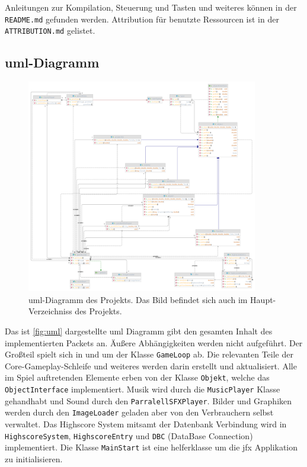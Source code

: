 Anleitungen zur Kompilation, Steuerung und Tasten und weiteres können in der \texttt{README.md} gefunden werden.
Attribution für benutzte Ressourcen ist in der \texttt{ATTRIBUTION.md} gelistet.

\subsection{\acrshort{uml}-Diagramm}

\begin{figure}[H]
    \centering
    \includegraphics[width=0.9\textwidth]{img/uml.png}
    \caption{\gls{uml}-Diagramm des Projekts. Das Bild befindet sich auch im Haupt-Verzeichniss des Projekts.}
    \label{fig:uml}
\end{figure}

Das ist \autoref{fig:uml} dargestellte \gls{uml} Diagramm gibt den gesamten Inhalt des implementierten Packets an.
Äußere Abhängigkeiten werden nicht aufgeführt.
Der Großteil spielt sich in und um der Klasse \texttt{GameLoop} ab.
Die relevanten Teile der Core-Gameplay-Schleife und weiteres werden darin erstellt und aktualisiert.
Alle im Spiel auftretenden Elemente erben von der Klasse \texttt{Objekt}, welche das \texttt{ObjectInterface} implementiert.
Musik wird durch die \texttt{MusicPlayer} Klasse gehandhabt und Sound durch den \texttt{ParralellSFXPlayer}.
Bilder und Graphiken werden durch den \texttt{ImageLoader} geladen aber von den Verbrauchern selbst verwaltet.
Das Highscore System mitsamt der Datenbank Verbindung wird in \texttt{HighscoreSystem}, \texttt{HighscoreEntry} und \texttt{DBC} (DataBase Connection) implementiert.
Die Klasse \texttt{MainStart} ist eine helferklasse um die \gls{jfx} Applikation zu initialisieren.
